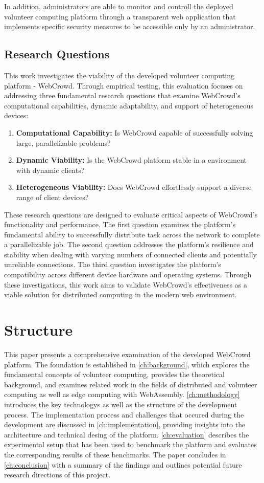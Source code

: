 In addition, administrators are able to monitor and controll the deployed volunteer computing platform through a transparent web application that implements specific security measures to be accessible only by an administrator.

\subsection{Research Questions}
\label{subsec:into:objectives:questions}
This work investigates the viability of the developed volunteer computing platform - WebCrowd. Through empirical testing, this evaluation focuses on addressing three fundamental research questions that examine WebCrowd's computational capabilities, dynamic adaptability, and support of heterogeneous devices:
\begin{enumerate}
    \item \textbf{Computational Capability:} Is WebCrowd capable of successfully solving large, parallelizable problems?
    \item \textbf{Dynamic Viability:} Is the WebCrowd platform stable in a environment with dynamic clients?
    \item \textbf{Heterogeneous Viability:} Does WebCrowd effortlessly support a diverse range of client devices?
\end{enumerate}
These research questions are designed to evaluate critical aspects of WebCrowd's functionality and performance. The first question examines the platform's fundamental ability to successfully distribute task across the network to complete a parallelizable job. The second question addresses the platform's resilience and stability when dealing with varying numbers of connected clients and potentially unreliable connections. The third question investigates the platform's compatibility across different device hardware and operating systems. Through these investigations, this work aims to validate WebCrowd's effectiveness as a viable solution for distributed computing in the modern web environment.

\section{Structure}
\label{sec:intro:structure}
This paper presents a comprehensive examination of the developed WebCrowd platform. The foundation is established in \autoref{ch:background}, which explores the fundamental concepts of volunteer computing, provides the theoretical background, and examines related work in the fields of distributed and volunteer computing as well as edge computing with WebAssembly. \autoref{ch:methodology} introduces the key technologys as well as the structure of the development process. The implementation process and challenges that occured during the development are discussed in \autoref{ch:implementation}, providing insights into the architecture and technical desing of the platform. \autoref{ch:evaluation} describes the experimental setup that has been used to benchmark the platform and evaluates the corresponding results of these benchmarks. The paper concludes in \autoref{ch:conclusion} with a summary of the findings and outlines potential future research directions of this project.